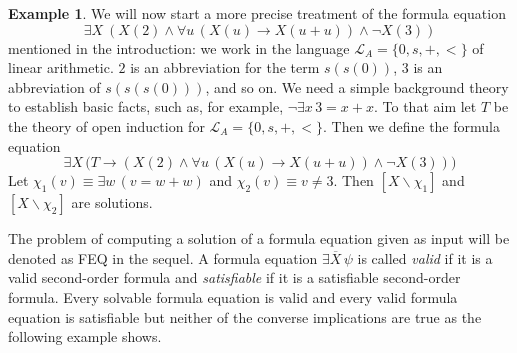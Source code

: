 \documentclass[acmsmall]{acmart}
\theoremstyle{plain}
\theoremstyle{definition}
\newtheorem{example}[theorem]{Example}
\newcommand{\calL}{\mathcal{L}}
\newcommand{\mybar}[1]{\overline{#1}}
\newcommand{\sop}{[} %
\newcommand{\scl}{]} %
\newcommand{\sel}[2]{#1 \backslash #2} %
\newcommand{\unsubst}[2]{\sop \sel{#1}{#2} \scl} %
\newcommand{\impl}{\rightarrow} %
\begin{document}
\begin{example}\label{ex.runex_intro}
We will now start a more precise treatment of the formula equation
\[
 \exists X\ (X(2) \land \forall u\, (X(u) \impl X(u+u)) \land \neg X(3))
\]
mentioned in the introduction: we work in the language $\calL_A = \{0,s,+,<\}$ of linear arithmetic.
$2$ is an abbreviation for the term $s(s(0))$, $3$ is an abbreviation of $s(s(s(0)))$, and so on.
We need a simple background theory to establish basic facts, such as, for example,
 $\neg \exists x\, 3 = x + x$.
To that aim let $T$ be the theory of open induction for $\calL_A = \{0,s,+,<\}$.
Then we define the formula equation
\[
\exists X\, \big( T \impl (X(2) \land \forall u\, (X(u) \impl X(u+u)) \land \neg X(3)) \big)
\]
Let $\chi_1(v) \equiv \exists w\, (v = w + w)$ and $\chi_2(v) \equiv  v \neq 3$. Then $\unsubst{X}{\chi_1}$ and $\unsubst{X}{\chi_2}$ are solutions.
\end{example}
%
The problem of computing a solution of a formula equation given as input will be denoted as FEQ in the sequel.
A formula equation $\exists \mybar{X}\, \psi$ is called {\em valid} if it is a valid second-order formula
 and {\em satisfiable} if it is a satisfiable second-order formula.
Every solvable formula equation is valid and every valid formula equation is satisfiable but neither of
 the converse implications are true as the following example shows.
%
\end{document}
